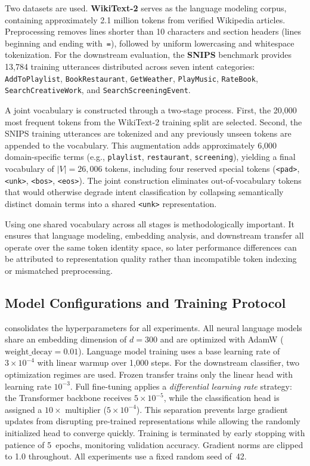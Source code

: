 \documentclass[10pt,a4paper]{article}
\begin{document}
Two datasets are used. \textbf{WikiText-2} serves as the language modeling corpus, containing approximately 2.1 million tokens from verified Wikipedia articles. Preprocessing removes lines shorter than 10 characters and section headers (lines beginning and ending with~\texttt{=}), followed by uniform lowercasing and whitespace tokenization. For the downstream evaluation, the \textbf{SNIPS} benchmark provides 13{,}784 training utterances distributed across seven intent categories: \texttt{AddToPlaylist}, \texttt{BookRestaurant}, \texttt{GetWeather}, \texttt{PlayMusic}, \texttt{RateBook}, \texttt{SearchCreativeWork}, and \texttt{SearchScreeningEvent}.

A joint vocabulary is constructed through a two-stage process. First, the 20{,}000 most frequent tokens from the WikiText-2 training split are selected. Second, the SNIPS training utterances are tokenized and any previously unseen tokens are appended to the vocabulary. This augmentation adds approximately 6{,}000 domain-specific terms (e.g., \texttt{playlist}, \texttt{restaurant}, \texttt{screening}), yielding a final vocabulary of $|V| = 26{,}006$ tokens, including four reserved special tokens (\texttt{<pad>}, \texttt{<unk>}, \texttt{<bos>}, \texttt{<eos>}). The joint construction eliminates out-of-vocabulary tokens that would otherwise degrade intent classification by collapsing semantically distinct domain terms into a shared \texttt{<unk>} representation.

Using one shared vocabulary across all stages is methodologically important. It ensures that language modeling, embedding analysis, and downstream transfer all operate over the same token identity space, so later performance differences can be attributed to representation quality rather than incompatible token indexing or mismatched preprocessing.

\subsection{Model Configurations and Training Protocol}
\label{sec:config}

 consolidates the hyperparameters for all experiments. All neural language models share an embedding dimension of $d = 300$ and are optimized with AdamW ($\text{weight\_decay} = 0.01$). Language model training uses a base learning rate of $3 \times 10^{-4}$ with linear warmup over 1{,}000 steps. For the downstream classifier, two optimization regimes are used. Frozen transfer trains only the linear head with learning rate $10^{-3}$. Full fine-tuning applies a \emph{differential learning rate} strategy: the Transformer backbone receives $5 \times 10^{-5}$, while the classification head is assigned a $10\times$ multiplier ($5 \times 10^{-4}$). This separation prevents large gradient updates from disrupting pre-trained representations while allowing the randomly initialized head to converge quickly. Training is terminated by early stopping with patience of 5~epochs, monitoring validation accuracy. Gradient norms are clipped to 1.0 throughout. All experiments use a fixed random seed of~42.
\end{document}
